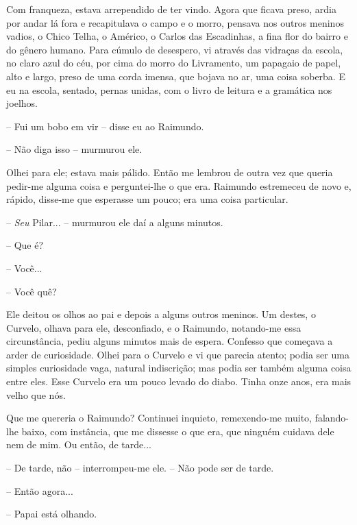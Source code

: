Com franqueza, estava arrependido de ter vindo. Agora que ficava preso,
ardia por andar lá fora e recapitulava o campo e o morro, pensava nos
outros meninos vadios, o Chico Telha, o Américo, o Carlos das
Escadinhas, a fina flor do bairro e do gênero humano. Para cúmulo de
desespero, vi através das vidraças da escola, no claro azul do céu, por
cima do morro do Livramento, um papagaio de papel, alto e largo, preso
de uma corda imensa, que bojava no ar, uma coisa soberba. E eu na
escola, sentado, pernas unidas, com o livro de leitura e a gramática nos
joelhos.

-- Fui um bobo em vir -- disse eu ao Raimundo.

-- Não diga isso -- murmurou ele.

Olhei para ele; estava mais pálido. Então me lembrou de outra vez que
queria pedir-me alguma coisa e perguntei-lhe o que era. Raimundo
estremeceu de novo e, rápido, disse-me que esperasse um pouco; era uma
coisa particular.

-- \emph{Seu} Pilar... -- murmurou ele daí a alguns minutos.

-- Que é?

-- Você...

-- Você quê?

Ele deitou os olhos ao pai e depois a alguns outros meninos. Um destes,
o Curvelo, olhava para ele, desconfiado, e o Raimundo, notando-me essa
circunstância, pediu alguns minutos mais de espera. Confesso que
começava a arder de curiosidade. Olhei para o Curvelo e vi que parecia
atento; podia ser uma simples curiosidade vaga, natural indiscrição; mas
podia ser também alguma coisa entre eles. Esse Curvelo era um pouco
levado do diabo. Tinha onze anos, era mais velho que nós.

Que me quereria o Raimundo? Continuei inquieto, remexendo-me muito,
falando-lhe baixo, com instância, que me dissesse o que era, que ninguém
cuidava dele nem de mim. Ou então, de tarde...

-- De tarde, não -- interrompeu-me ele. -- Não pode ser de tarde.

-- Então agora...

-- Papai está olhando.

